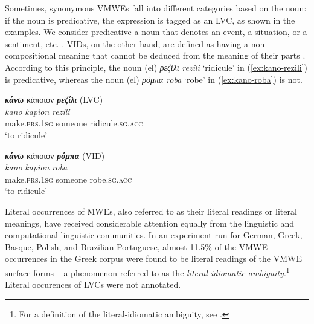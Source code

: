 \documentclass[output=paper,colorlinks,citecolor=brown]{langscibook}
\begin{document}
Sometimes, synonymous VMWEs fall into different categories based on the noun: if the noun is predicative, the expression is tagged as an LVC, as shown in the examples. We consider predicative a noun that denotes an event, a situation, or a sentiment, etc. \citep{gross_methodes_1975, gross_1982}. VIDs, on the other hand, are defined as having a non-compositional meaning that cannot be deduced from the meaning of their parts \citep{gross_1982}. According to this principle, the noun (el) \textit{ρεζίλι} \textit{rezili} `ridicule' in (\ref{ex:kano-rezili}) is predicative, whereas the noun (el) \textit{ρόμπα} \textit{roba} `robe' in (\ref{ex:kano-roba}) is not.

\ea
 \label{ex:kano-rezili}
 \settowidth {}
 \glll
 \textbf{\em{κάνω}} κάποιον \textbf{\em{ρεζίλι}} (LVC)\\ 
\textit{kano} \textit{kapion} \textit{rezili} \\
make.\textsc{prs.1sg} someone ridicule.\textsc{sg.acc} \\
\glt `to ridicule' \\
\z

\ea
 \label{ex:kano-roba}
 \settowidth {}
 \glll
 \textbf{\em{κάνω}} κάποιον \textbf{\em{ρόμπα}} (VID)\\ 
\textit{kano} \textit{kapion} \textit{roba} \\
make.\textsc{prs.1sg} someone robe.\textsc{sg.acc} \\
\glt `to ridicule' \\
\z


Literal occurrences of MWEs, also referred to as their literal readings or literal meanings, have received considerable attention equally from the linguistic and computational linguistic communities. In an experiment run for German, Greek, Basque, Polish, and Brazilian Portuguese, \citep{savary_etal_2019} almost 11.5\% of the VMWE occurrences in the Greek corpus were found to be literal readings of the VMWE surface forms -- a phenomenon referred to as the \textit{literal-idiomatic ambiguity}.\footnote{For a definition of the literal-idiomatic ambiguity, see \citet{savary_etal_2019}.} Literal occurences of LVCs were not annotated.

 
\end{document}
